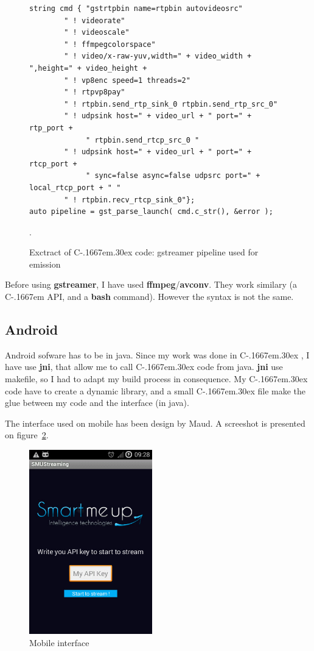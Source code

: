 \documentclass[a4paper,11pt]{custom}
\newcommand{\avconv}{\textbf{avconv}\xspace}
\newcommand{\ffmpeg}{\textbf{ffmpeg}\xspace}
\newcommand{\gstreamer}{\textbf{gstreamer}\xspace}
\newcommand{\jni}{\textbf{jni}\xspace}
\newcommand{\bash}{\textbf{bash}\xspace}
\newcommand{\cpp}{%
  C\kern-.1667em\raise.30ex\hbox{\smaller{++}\xspace}%
  \spacefactor1000%
}
\newcommand{\clang}{%
  C\kern-.1667em%
  \xspace%
}
\begin{document}
\begin{figure}
\begin{lstlisting}
string cmd { "gstrtpbin name=rtpbin autovideosrc"
        " ! videorate"
        " ! videoscale"
        " ! ffmpegcolorspace"
        " ! video/x-raw-yuv,width=" + video_width + ",height=" + video_height +
        " ! vp8enc speed=1 threads=2"
        " ! rtpvp8pay"
        " ! rtpbin.send_rtp_sink_0 rtpbin.send_rtp_src_0"
        " ! udpsink host=" + video_url + " port=" + rtp_port +
             " rtpbin.send_rtcp_src_0 "
        " ! udpsink host=" + video_url + " port=" + rtcp_port +
             " sync=false async=false udpsrc port=" + local_rtcp_port + " "
        " ! rtpbin.recv_rtcp_sink_0"};
auto pipeline = gst_parse_launch( cmd.c_str(), &error );
\end{lstlisting}
\label{fig:exctractcppcode}
\caption{Exctract of \cpp code: gstreamer pipeline used for emission}.
\end{figure}

Before using \gstreamer, I have used \ffmpeg/\avconv. They work similary (a
\clang API, and a \bash command). However the syntax is not the same.

\subsection{Android}

Android sofware has to be in java. Since my work was done in \cpp, I have use
\jni, that allow me to call \cpp code from java. \jni use makefile, so I had to
adapt my build process in consequence. My \cpp code have to create a dynamic
library, and a small \cpp file make the glue between my code and the interface
(in java).

The interface used on mobile has been design by Maud. A screeshot is presented
on figure~\ref{fig:smumobile}.

\begin{figure}
\centering
\includegraphics[height=8cm]{smu_mobile.jpg}
\caption{Mobile interface}
\label{fig:smumobile}
\end{figure}
\end{document}
